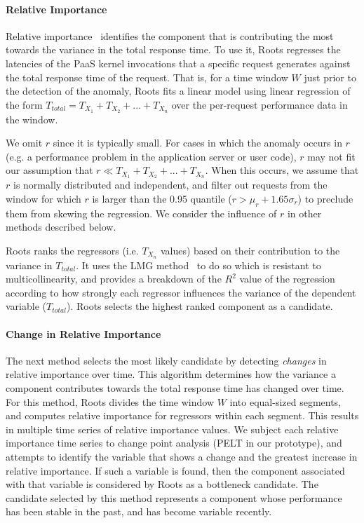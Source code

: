 \paragraph*{Relative Importance}
Relative importance~\cite{JSSv017i01} identifies the component that is contributing 
the most towards the variance in the total response time. 
To use it, Roots regresses the latencies of the PaaS kernel invocations
that a specific request generates against the total 
response time of the request.
That is, for a time window $W$ just prior to the detection of the anomaly, Roots
fits a linear model using linear regression of the form
$T_{total} = T_{X_1} + T_{X_2} + ... + T_{X_n}$
over the per-request performance data in the window.

We omit $r$ since it is typically small.
For cases in which the anomaly occurs in $r$ (e.g. a performance problem in the 
application server or user code), $r$ may
not fit our assumption that $r \ll T_{X_1} + T_{X_2} + ... + T_{X_n}$.  When this
occurs, we assume that $r$ is normally distributed and independent, and filter out
requests from the window for which $r$ is larger than the 0.95 quantile ($r > \mu_r + 1.65\sigma_r$)
to preclude them from skewing the regression. 
We consider the influence of $r$ in other methods described below.

Roots ranks the regressors (i.e. $T_{X_n}$ values) based on their contribution to the variance 
in $T_{total}$.  It uses the LMG method~\cite{lmg80} to do so which is resistant to multicollinearity, 
and provides a breakdown of the $R^2$ value of
the regression according to how strongly each regressor influences
the variance of the dependent variable ($T_{total}$).
Roots selects the highest ranked component as a candidate.

\paragraph*{Change in Relative Importance}
The next method selects the most likely candidate by detecting \textit{changes} in relative importance
over time.
This algorithm determines 
how the variance a component contributes towards the total response time has
changed over time.
For this method, Roots divides the time window $W$ into equal-sized segments,
and computes relative importance for regressors within each segment. 
This results in multiple time series of relative importance values.
We subject each relative importance time series to change point analysis (PELT in our prototype), 
and attempts to
identify the variable that shows a change and the greatest
increase in relative importance.
If such a variable is found, then the component
associated with that variable is considered by Roots as a bottleneck candidate.
The candidate selected by this method represents
a component whose performance has been stable in the past, and has become variable recently.

